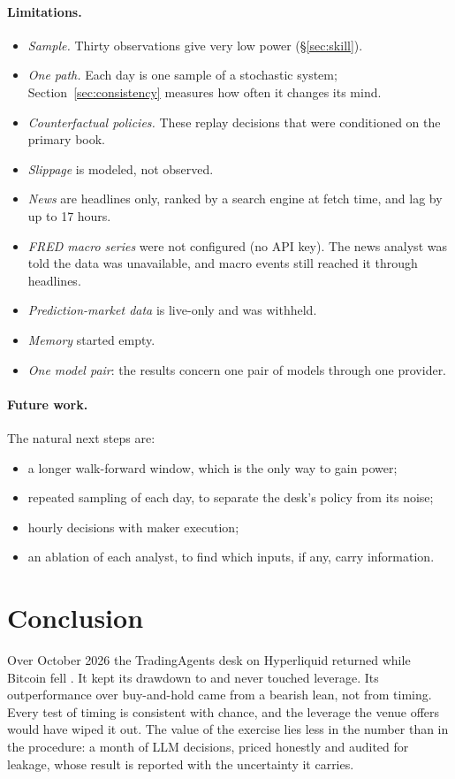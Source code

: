 \paragraph{Limitations.}
\begin{itemize}
\item \emph{Sample.} Thirty observations give very low power (\S\ref{sec:skill}).
\item \emph{One path.} Each day is one sample of a stochastic system; Section~\ref{sec:consistency} measures how often it changes its mind.
\item \emph{Counterfactual policies.} These replay decisions that were conditioned on the primary book.
\item \emph{Slippage} is modeled, not observed.
\item \emph{News} are headlines only, ranked by a search engine at fetch time, and lag by up to 17 hours.
\item \emph{FRED macro series} were not configured (no API key). The news analyst was told the data was unavailable, and macro events still reached it through headlines.
\item \emph{Prediction-market data} is live-only and was withheld.
\item \emph{Memory} started empty.
\item \emph{One model pair}: the results concern one pair of models through one provider.
\end{itemize}

\paragraph{Future work.} The natural next steps are:
\begin{itemize}
\item a longer walk-forward window, which is the only way to gain power;
\item repeated sampling of each day, to separate the desk's policy from its noise;
\item hourly decisions with maker execution;
\item an ablation of each analyst, to find which inputs, if any, carry information.
\end{itemize}

\section{Conclusion}
Over October 2026 the TradingAgents desk on Hyperliquid returned \AgentRet{} while Bitcoin fell \BTCWindow{}. It kept its drawdown to \AgentMDD{} and never touched leverage. Its outperformance over buy-and-hold came from a bearish lean, not from timing. Every test of timing is consistent with chance, and the leverage the venue offers would have wiped it out. The value of the exercise lies less in the number than in the procedure: a month of LLM decisions, priced honestly and audited for leakage, whose result is reported with the uncertainty it carries.
